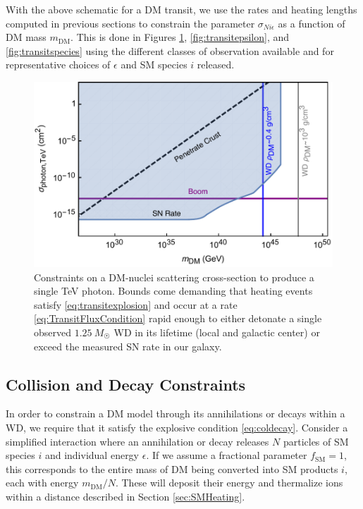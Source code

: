 \documentclass[twocolumn, preprintnumbers,amsmath,amssymb,prd, superscriptaddress]{revtex4}
\begin{document}
With the above schematic for a DM transit, we use the rates and heating lengths computed in previous sections to constrain the parameter $\sigma_{Ni\epsilon}$ as a function of DM mass $m_\text{DM}$.
This is done in Figures \ref{fig:transitclasses}, \ref{fig:transitepsilon}, and \ref{fig:transitspecies} using the different classes of observation available and for representative choices of $\epsilon$ and SM species $i$ released.

\begin{figure}
\includegraphics[scale=.45]{transitobservation.pdf}
\caption{Constraints on a DM-nuclei scattering cross-section to produce a single TeV photon. Bounds come demanding that heating events satisfy \eqref{eq:transitexplosion} and occur at a rate \eqref{eq:TransitFluxCondition} rapid enough to either detonate a single observed $1.25~M_{\astrosun}$ WD in its lifetime (local and galactic center) or exceed the measured SN rate in our galaxy.}
\label{fig:transitclasses}
\end{figure}

\subsection{Collision and Decay Constraints}
\label{sec:CollisionConstraints}

In order to constrain a DM model through its annihilations or decays within a WD, we require that it satisfy the explosive condition \eqref{eq:coldecay}.
Consider a simplified interaction where an annihilation or decay releases $N$ particles of SM species $i$ and individual energy $\epsilon$.
If we assume a fractional parameter $f_\text{SM}=1$, this corresponds to the entire mass of DM being converted into SM products $i$, each with energy $m_\text{DM}/N$.
These will deposit their energy and thermalize ions within a distance described in Section \ref{sec:SMHeating}.
\end{document}
